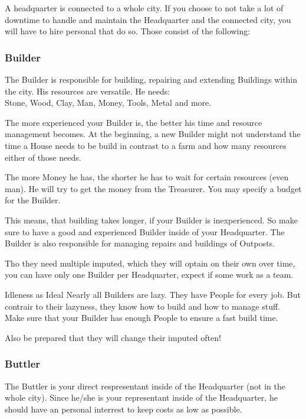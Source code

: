 A headquarter is connected to a whole city. If you choose to not take a lot of downtime to handle and maintain the Headquarter and the connected city, you will have to hire personal that do so. Those consist of the following:

\subsubsection{Builder}

The Builder is responsible for building, repairing and extending Buildings within the city. His resources are versatile. He needs:\\
Stone, Wood, Clay, Man, Money, Tools, Metal and more.

The more experienced your Builder is, the better his time and resource management becomes. At the beginning, a new Builder might not understand the time a House needs to be build in contrast to a farm and how many resources either of those needs.

The more Money he has, the shorter he has to wait for certain resources (even man). He will try to get the money from the Treasurer. You may specify a budget for the Builder.

This means, that building takes longer, if your Builder is inexperienced. So make sure to have a good and experienced Builder inside of your Headquarter. The Builder is also responsible for managing repairs and buildings of Outposts.

Tho they need multiple imputed, which they will optain on their own over time, you can have only one Builder per Headquarter, expect if some work as a team.

\begin{paperbox}{Idleness as Ideal}
Nearly all Builders are lazy. They have People for every job. But contrair to their lazyness, they know how to build and how to manage stuff. Make sure that your Builder has enough People to ensure a fast build time.

Also be prepared that they will change their imputed often!
\end{paperbox}

\subsubsection{Buttler}

The Buttler is your direct respresentant inside of the Headquarter (not in the whole city). Since he/she is your representant inside of the Headquarter, he should have an personal interrest to keep costs as low as possible.

